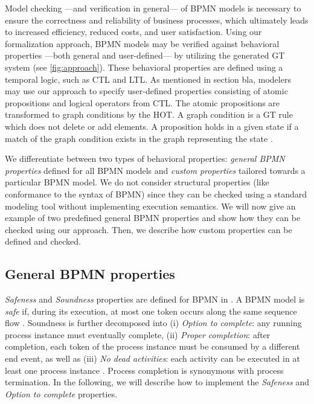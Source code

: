 \documentclass{lmcs} %
\begin{document}
Model checking ---and verification in general--- of BPMN models is necessary to ensure the correctness and reliability of business processes, which ultimately leads to increased efficiency, reduced costs, and user satisfaction.
Using our formalization approach, BPMN models may be verified against behavioral properties ---both general and user-defined--- by utilizing the generated GT system (see \autoref{fig:approach}).
These behavioral properties are defined using a temporal logic, such as CTL and LTL.
As mentioned in section bla, modelers may use our approach to specify user-defined properties consisting of atomic propositions and logical operators from CTL.
The atomic propositions are transformed to graph conditions by the HOT.
A graph condition is a GT rule which does not delete or add elements.
A proposition holds in a given state if a match of the graph condition exists in the graph representing the state \cite{kastenbergModelCheckingDynamic2006}.

We differentiate between two types of behavioral properties: \textit{general BPMN properties} defined for all BPMN models and \textit{custom properties} tailored towards a particular BPMN model.
We do not consider structural properties (like conformance to the syntax of BPMN) since they can be checked using a standard modeling tool without implementing execution semantics.
We will now give an example of two predefined general BPMN properties and show how they can be checked using our approach.
Then, we describe how custom properties can be defined and checked.

\subsection{General BPMN properties}
\textit{Safeness} and \textit{Soundness} properties are defined for BPMN in \cite{corradiniClassificationBPMNCollaborations2018}.
A BPMN model is \textit{safe} if, during its execution, at most one token occurs along the same sequence flow \cite{corradiniClassificationBPMNCollaborations2018}.
Soundness is further decomposed into (i) \textit{Option to complete}: any running process instance must eventually complete, (ii) \textit{Proper completion}: after completion, each token of the process instance must be consumed by a different end event, as well as (iii) \textit{No dead activities}: each activity can be executed in at least one process instance \cite{corradiniClassificationBPMNCollaborations2018}.
Process completion is synonymous with process termination.
In the following, we will describe how to implement the \textit{Safeness} and \textit{Option to complete} properties.
\end{document}
